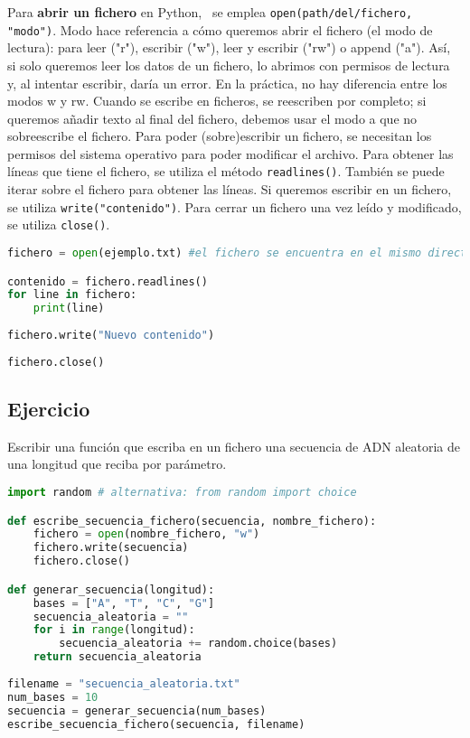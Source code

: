 Para \textbf{abrir un fichero} en Python,   \ se emplea \texttt{open(path/del/fichero, "modo")}. Modo hace referencia a cómo queremos abrir el fichero (el modo de lectura): para leer ("r"), escribir ("w"), leer y escribir ("rw") o append ("a"). Así, si solo queremos leer los datos de un fichero, lo abrimos con permisos de lectura y, al intentar escribir, daría un error. En la práctica, no hay diferencia entre los modos w y rw. Cuando se escribe en ficheros, se reescriben por completo; si queremos añadir texto al final del fichero, debemos usar el modo a que no sobreescribe el fichero. Para poder (sobre)escribir un fichero, se necesitan los permisos del sistema operativo para poder modificar el archivo. Para obtener las líneas que tiene el fichero, se utiliza el método \texttt{readlines()}. También se puede iterar sobre el fichero para obtener las líneas. Si queremos escribir en un fichero, se utiliza \texttt{write("contenido")}. Para cerrar un fichero una vez leído y modificado, se utiliza \texttt{close()}.
\begin{lstlisting}[language=Python]
fichero = open(ejemplo.txt) #el fichero se encuentra en el mismo directorio

contenido = fichero.readlines()
for line in fichero:
	print(line)
	
fichero.write("Nuevo contenido")
	
fichero.close()
\end{lstlisting}

\subsection{Ejercicio}
Escribir una función que escriba en un fichero una secuencia de ADN aleatoria de una longitud que reciba por parámetro.
\begin{lstlisting}[language=Python]
import random # alternativa: from random import choice

def escribe_secuencia_fichero(secuencia, nombre_fichero):
	fichero = open(nombre_fichero, "w")
	fichero.write(secuencia)
	fichero.close()

def generar_secuencia(longitud):
	bases = ["A", "T", "C", "G"] 
	secuencia_aleatoria = ""
	for i in range(longitud):
		secuencia_aleatoria += random.choice(bases)
	return secuencia_aleatoria
	
filename = "secuencia_aleatoria.txt"
num_bases = 10
secuencia = generar_secuencia(num_bases)
escribe_secuencia_fichero(secuencia, filename)
\end{lstlisting}


